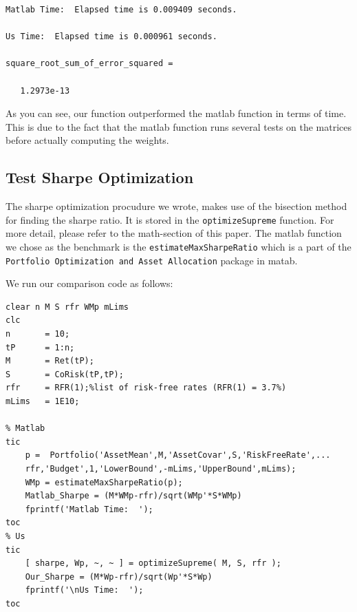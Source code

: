 \documentclass[12pt,titlepage,a4paper]{article}
\begin{document}
        \color{lightgray} \begin{verbatim}Matlab Time:  Elapsed time is 0.009409 seconds.

Us Time:  Elapsed time is 0.000961 seconds.

square_root_sum_of_error_squared =

   1.2973e-13

\end{verbatim} \color{black}
    \begin{par}
As you can see, our function outperformed the matlab function in terms of time. This is due to the fact that the matlab function runs several tests on the matrices before actually computing the weights.
\end{par} \vspace{1em}


\subsection*{Test Sharpe Optimization}

\begin{par}
The sharpe optimization procudure we wrote, makes use of the bisection method for finding the sharpe ratio. It is stored in the \texttt{optimizeSupreme} function. For more detail, please refer to the math-section of this paper. The matlab function we chose as the benchmark is the \texttt{estimateMaxSharpeRatio} which is a part of the \texttt{Portfolio Optimization and Asset Allocation} package in matab.
\end{par} \vspace{1em}
\begin{par}
We run our comparison code as follows:
\end{par} \vspace{1em}
\begin{verbatim}
clear n M S rfr WMp mLims
clc
n       = 10;
tP      = 1:n;
M       = Ret(tP);
S       = CoRisk(tP,tP);
rfr     = RFR(1);%list of risk-free rates (RFR(1) = 3.7%)
mLims   = 1E10;

% Matlab
tic
    p =  Portfolio('AssetMean',M,'AssetCovar',S,'RiskFreeRate',...
    rfr,'Budget',1,'LowerBound',-mLims,'UpperBound',mLims);
    WMp = estimateMaxSharpeRatio(p);
    Matlab_Sharpe = (M*WMp-rfr)/sqrt(WMp'*S*WMp)
    fprintf('Matlab Time:  ');
toc
% Us
tic
    [ sharpe, Wp, ~, ~ ] = optimizeSupreme( M, S, rfr );
    Our_Sharpe = (M*Wp-rfr)/sqrt(Wp'*S*Wp)
    fprintf('\nUs Time:  ');
toc
\end{verbatim}
\end{document}
